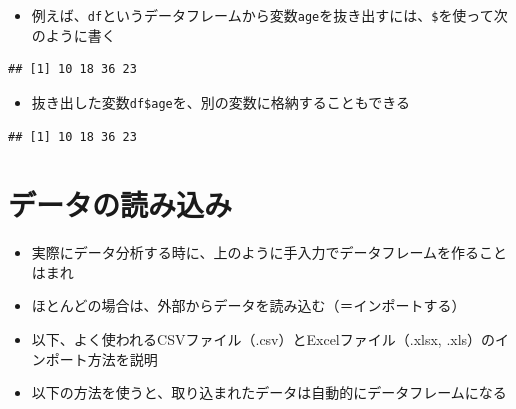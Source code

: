 \documentclass[
]{book}
\newenvironment{Shaded}{\begin{snugshade}}{\end{snugshade}}
\newcommand{\NormalTok}[1]{#1}
\newcommand{\OtherTok}[1]{\textcolor[rgb]{0.56,0.35,0.01}{#1}}
\newcommand{\SpecialCharTok}[1]{\textcolor[rgb]{0.81,0.36,0.00}{\textbf{#1}}}
\providecommand{\tightlist}{%
  \setlength{\itemsep}{0pt}\setlength{\parskip}{0pt}}
\begin{document}
\begin{itemize}
\tightlist
\item
  例えば、\texttt{df}というデータフレームから変数\texttt{age}を抜き出すには、\texttt{\$}を使って次のように書く
\end{itemize}

\begin{Shaded}
\end{Shaded}

\begin{verbatim}
## [1] 10 18 36 23
\end{verbatim}

\begin{itemize}
\tightlist
\item
  抜き出した変数\texttt{df\$age}を、別の変数に格納することもできる
\end{itemize}

\begin{Shaded}
\end{Shaded}

\begin{verbatim}
## [1] 10 18 36 23
\end{verbatim}

\hypertarget{ux30c7ux30fcux30bfux306eux8aadux307fux8fbcux307f-1}{%
\section{データの読み込み}\label{ux30c7ux30fcux30bfux306eux8aadux307fux8fbcux307f-1}}

\begin{itemize}
\tightlist
\item
  実際にデータ分析する時に、上のように手入力でデータフレームを作ることはまれ
\item
  ほとんどの場合は、外部からデータを読み込む（＝インポートする）
\item
  以下、よく使われるCSVファイル（.csv）とExcelファイル（.xlsx, .xls）のインポート方法を説明
\item
  以下の方法を使うと、取り込まれたデータは自動的にデータフレームになる
\end{itemize}
\end{document}
